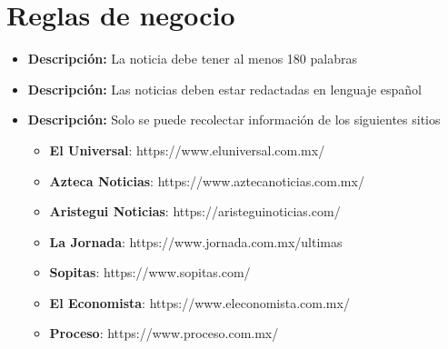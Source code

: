 \documentclass[12pt]{article}
\begin{document}
\section{Reglas de negocio}
\begin{itemize}
  \item \textbf{Descripción:}  La noticia debe tener al menos 180 palabras
\end{itemize}


\begin{itemize}
  \item \textbf{Descripción:} Las noticias deben estar redactadas en lenguaje español
\end{itemize}

\begin{itemize}
  \item \textbf{Descripción:} Solo se puede recolectar información de los siguientes sitios\\

  \begin{itemize}

    \item \textbf{El Universal}: https://www.eluniversal.com.mx/
    \item \textbf{Azteca Noticias}: https://www.aztecanoticias.com.mx/
    \item \textbf{Aristegui Noticias}: https://aristeguinoticias.com/
    \item \textbf{La Jornada}: https://www.jornada.com.mx/ultimas
    \item \textbf{Sopitas}: https://www.sopitas.com/
    \item \textbf{El Economista}: https://www.eleconomista.com.mx/
    \item \textbf{Proceso}: https://www.proceso.com.mx/

  \end{itemize} 
\end{itemize}

\end{document}
